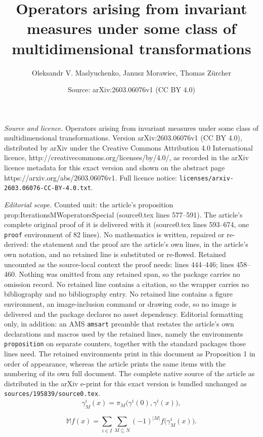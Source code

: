 \documentclass[10pt,a4paper]{amsart}
\title{Operators arising from invariant measures under some class of multidimensional transformations}
\author{Oleksandr V. Maslyuchenko, Janusz Morawiec, Thomas Z\"urcher}
\date{Source: arXiv:2603.06076v1 (CC BY 4.0)}
\begin{document}
\maketitle

\noindent\emph{Source and licence.} Operators arising from invariant measures under some class of multidimensional transformations. Version arXiv:2603.06076v1 (CC BY 4.0), distributed by arXiv under the Creative Commons Attribution 4.0 International licence, http://creativecommons.org/licenses/by/4.0/, as recorded in the arXiv licence metadata for this exact version and shown on the abstract page https://arxiv.org/abs/2603.06076v1. Full licence notice: \texttt{licenses/arxiv-2603.06076-CC-BY-4.0.txt}.\par\smallskip

\noindent\textit{Editorial scope.} Counted unit: the article's proposition prop:IterationsMWoperatorsSpecial (source0.tex lines 577--591). The article's complete original proof of it is delivered with it (source0.tex lines 593--674, one \texttt{proof} environment of 82 lines). No mathematics is written, repaired or re-derived: the statement and the proof are the article's own lines, in the article's own notation, and no retained line is substituted or re-flowed.  Retained uncounted as the source-local context the proof needs: lines 444--446; lines 458--460.  Nothing was omitted from any retained span, so the package carries no omission record.  No retained line contains a citation, so the wrapper carries no bibliography and no bibliography entry.  No retained line contains a figure environment, an image-inclusion command or drawing code, so no image is delivered and the package declares no asset dependency.  Editorial formatting only, in addition: an AMS \texttt{amsart} preamble that restates the article's own declarations and macros used by the retained lines, namely the environments \texttt{proposition} on separate counters, together with the standard packages those lines need.  The retained environments print in this document as Proposition 1 in order of appearance, whereas the article prints the same items with the numbering of its own full document.  The complete native source of the article as distributed in the arXiv e-print for this exact version is bundled unchanged as \texttt{sources/195839/source0.tex}.
\begin{equation}\label{gammaiM}
\gamma^i_M(x)=\pi_M\big(\gamma^i(0),\gamma^i(x)\big),
\end{equation}

\begin{equation}\label{equ:MWoperatorDirect}
\mathbb{M}f(x)=\sum_{i\in I}\sum_{M\subseteq N}(-1)^{|M|}f\big(\gamma^i_M(x)\big).
\end{equation}
\end{document}
